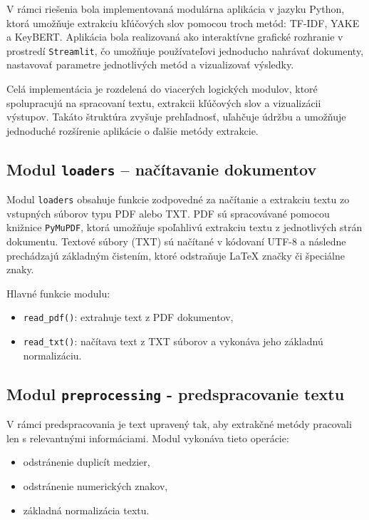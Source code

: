 \documentclass[a4paper,12pt]{article}
\begin{document}
V rámci riešenia bola implementovaná modulárna aplikácia v jazyku Python, ktorá umožňuje extrakciu kľúčových slov pomocou troch metód: TF-IDF, YAKE a KeyBERT. Aplikácia bola realizovaná ako interaktívne grafické rozhranie v prostredí \texttt{Streamlit}, čo umožňuje používateľovi jednoducho nahrávať dokumenty, nastavovať parametre jednotlivých metód a vizualizovať výsledky.

Celá implementácia je rozdelená do viacerých logických modulov, ktoré spolupracujú na spracovaní textu, extrakcii kľúčových slov a vizualizácii výstupov. Takáto štruktúra zvyšuje prehľadnosť, uľahčuje údržbu a umožňuje jednoduché rozšírenie aplikácie o ďalšie metódy extrakcie.

\subsection{Modul \texttt{loaders} – načítavanie dokumentov}

Modul \texttt{loaders} obsahuje funkcie zodpovedné za načítanie a extrakciu textu zo vstupných súborov typu PDF alebo TXT.  
PDF sú spracovávané pomocou knižnice \texttt{PyMuPDF}, ktorá umožňuje spoľahlivú extrakciu textu z jednotlivých strán dokumentu. Textové súbory (TXT) sú načítané v kódovaní UTF-8 a následne prechádzajú základným čistením, ktoré odstraňuje LaTeX značky či špeciálne znaky.

Hlavné funkcie modulu:
\begin{itemize}
    \item \texttt{read\_pdf()}: extrahuje text z PDF dokumentov,
    \item \texttt{read\_txt()}: načítava text z TXT súborov a vykonáva jeho základnú normalizáciu.
\end{itemize}

\subsection{Modul \texttt{preprocessing} - predspracovanie textu}

V rámci predspracovania je text upravený tak, aby extrakčné metódy pracovali len s relevantnými informáciami. Modul vykonáva tieto operácie:
\begin{itemize}
    \item odstránenie duplicít medzier,
    \item odstránenie numerických znakov,
    \item základná normalizácia textu.
\end{itemize}
\end{document}
